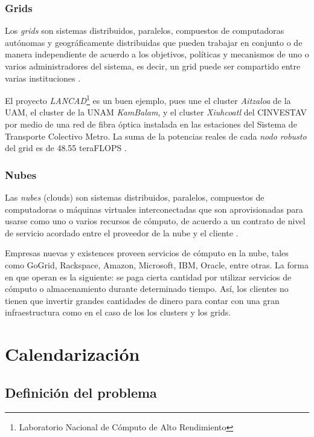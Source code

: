 \documentclass[letterpaper, 12pt]{report}
\begin{document}
\subsection{Grids}
Los \emph{grids} son sistemas distribuidos, paralelos, compuestos de computadoras autónomas y geográficamente distribuidas que pueden trabajar en conjunto o de manera independiente de acuerdo a los objetivos, políticas y mecanismos de uno o varios administradores del sistema, es decir, un grid puede ser compartido entre varias instituciones \cite{buyya2009cloud}. 

El proyecto \emph{LANCAD}\footnote{Laboratorio Nacional de Cómputo de Alto Rendimiento} es un buen ejemplo, pues une el cluster \emph{Aitzaloa} de la UAM, el cluster de la UNAM \emph{KamBalam}, y el cluster \emph{Xiuhcoatl} del CINVESTAV por medio de una red de fibra óptica instalada en las estaciones del Sistema de Transporte Colectivo Metro. La suma de la potencias reales de cada \emph{nodo robusto} del grid es de 48.55 teraFLOPS \cite{lancad2013xiuhcoatl}.

\subsection{Nubes}
Las \emph{nubes} (clouds) son sistemas distribuidos, paralelos, compuestos de computadoras o máquinas virtuales interconectadas que son aprovisionadas para usarse como uno o varios recursos de cómputo, de acuerdo a un contrato de nivel de servicio acordado entre el proveedor de la nube y el cliente \cite{buyya2009cloud}. 

Empresas nuevas y existences proveen servicios de cómputo en la nube, tales como GoGrid, Rackspace, Amazon, Microsoft, IBM, Oracle, entre otras. La forma en que operan es la siguiente: se paga cierta cantidad por utilizar servicios de cómputo o almacenamiento durante determinado tiempo. Así, los clientes no tienen que invertir grandes cantidades de dinero para contar con una gran infraestructura como en el caso de los los clusters y los grids.



\chapter{Calendarización}


\section{Definición del problema}
\end{document}
